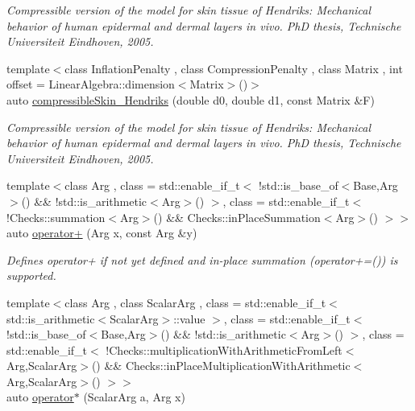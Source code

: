 \begin{DoxyCompactItemize}
\begin{DoxyCompactList}\small\item\em Compressible version of the model for skin tissue of Hendriks\-: Mechanical behavior of human epidermal and dermal layers in vivo. Ph\-D thesis, Technische Universiteit Eindhoven, 2005. \end{DoxyCompactList}\item 
{\footnotesize template$<$class Inflation\-Penalty , class Compression\-Penalty , class Matrix , int offset = Linear\-Algebra\-::dimension$<$\-Matrix$>$()$>$ }\\auto \hyperlink{group__Biomechanics_ga42721e772b7eada1b0bca98247ad440f}{compressible\-Skin\-\_\-\-Hendriks} (double d0, double d1, const Matrix \&F)
\begin{DoxyCompactList}\small\item\em Compressible version of the model for skin tissue of Hendriks\-: Mechanical behavior of human epidermal and dermal layers in vivo. Ph\-D thesis, Technische Universiteit Eindhoven, 2005. \end{DoxyCompactList}\item 
\hypertarget{namespaceFunG_a063d3e8c19dbea3ee1396736fecb64e1}{{\footnotesize template$<$class Arg , class  = std\-::enable\-\_\-if\-\_\-t$<$ !std\-::is\-\_\-base\-\_\-of$<$\-Base,\-Arg$>$() \&\& !std\-::is\-\_\-arithmetic$<$\-Arg$>$() $>$, class  = std\-::enable\-\_\-if\-\_\-t$<$ !\-Checks\-::summation$<$\-Arg$>$() \&\&                                       Checks\-::in\-Place\-Summation$<$\-Arg$>$() $>$$>$ }\\auto \hyperlink{namespaceFunG_a063d3e8c19dbea3ee1396736fecb64e1}{operator+} (Arg x, const Arg \&y)}\label{namespaceFunG_a063d3e8c19dbea3ee1396736fecb64e1}

\begin{DoxyCompactList}\small\item\em Defines operator+ if not yet defined and in-\/place summation (operator+=()) is supported. \end{DoxyCompactList}\item 
\hypertarget{namespaceFunG_a9b303ce8718a6f64b035e7e782370734}{{\footnotesize template$<$class Arg , class Scalar\-Arg , class  = std\-::enable\-\_\-if\-\_\-t$<$ std\-::is\-\_\-arithmetic$<$\-Scalar\-Arg$>$\-::value $>$, class  = std\-::enable\-\_\-if\-\_\-t$<$ !std\-::is\-\_\-base\-\_\-of$<$\-Base,\-Arg$>$() \&\& !std\-::is\-\_\-arithmetic$<$\-Arg$>$() $>$, class  = std\-::enable\-\_\-if\-\_\-t$<$ !\-Checks\-::multiplication\-With\-Arithmetic\-From\-Left$<$\-Arg,\-Scalar\-Arg$>$() \&\&                                       Checks\-::in\-Place\-Multiplication\-With\-Arithmetic$<$\-Arg,\-Scalar\-Arg$>$() $>$$>$ }\\auto \hyperlink{namespaceFunG_a9b303ce8718a6f64b035e7e782370734}{operator$\ast$} (Scalar\-Arg a, Arg x)}\label{namespaceFunG_a9b303ce8718a6f64b035e7e782370734}


\end{DoxyCompactItemize}
